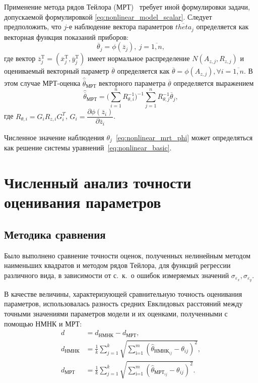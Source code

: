 Применение метода рядов Тейлора (МРТ)~\cite{mukha_2000}
требует иной формулировки задачи, допускаемой формулировкой \eqref{eq:nonlinear_model_scalar}.
Следует предположить, что \( j \)-е наблюдение вектора параметров \( \overline{theta}_j \)
определяется как векторная функция показаний приборов:
\begin{equation}
  \label{eq:nonlinear_mrt_phi}
  \overline{\theta}_j = \phi( \overline{z}_{j} ), \: j = \overline{1, n},
\end{equation}
где вектор
\( \overline{z}^{\text{T}}_{j} =
( \overline{x}^{\text{T}}_{j}, \overline{y}^{\text{T}}_{j}) \)
имеет нормальное распределение \( N(A_{z,j}, R_{z,j}) \)
и оцениваемый векторный параметр \( \overline{\theta} \) определяется как
\( \overline{\theta} = \phi(A_{z,j}), \forall i = \overline{1, n} \).
В этом случае МРТ-оценка \( \hat{\overline{\theta}}_{\text{МРТ}} \) векторного параметра \( \overline{\theta} \)
определяется выражением
\begin{equation}
  \label{eq:nonlinear_mrt}
  \hat{\overline{\theta}}_{\text{МРТ}} =
  \Bigg( \sum^{n}_{i=1} R^{-1}_{\theta,i} \Bigg)^{-1}
  \sum^{n}_{j=1} R^{-1}_{\theta,j} \overline{\theta}_j,
\end{equation}
где
\( R_{\theta,i} = G_i R_{z,i} G^T_i \),
\( G_i =
\dfrac{\partial \phi( \overline{z}_{i} ) }{ \partial \overline{z}_{i} } \).

Численное значение наблюдения \( \theta_j \)~\eqref{eq:nonlinear_mrt_phi} может определяться как
решение системы уравнений~\eqref{eq:nonlinear_basic}.


\section{Численный анализ точности оценивания параметров}

\subsection{Методика сравнения}

Было выполнено сравнение точности оценок,
полученных нелинейным методом наименьших квадратов и методом рядов Тейлора,
для функций регрессии различного вида,
в зависимости от с.~к.~о ошибок измеряемых значений
\( \sigma_{\varepsilon_x}, \sigma_{\varepsilon_y} \).

В качестве величины, характеризующей сравнительную точность оценивания параметров,
использовалась разность средних Евклидовых расстояний
между точными значениями параметров модели и их оценками, полученными
с помощью НМНК и МРТ:
\begin{equation}
  \begin{aligned}
    d &= d_{\text{НМНК}} - d_{\text{МРТ}}, \\
    d_{\text{НМНК}} &=
    \frac{1}{k} \sum_{j=1}^k
    \sqrt{\sum_{\text{i=1}}^m (\hat{\theta}_{\text{НМНК}_{ij}} - \theta_{ij})^2}, \\
    d_{\text{МРТ}} &=
    \frac{1}{k} \sum_{j=1}^k
    \sqrt{\sum_{\text{i=1}}^m (\hat{\theta}_{\text{МРТ}_{ij}} - \theta_{ij})^2}.
  \end{aligned}
  \label{eq:dst_nonlinear_param}
\end{equation}

